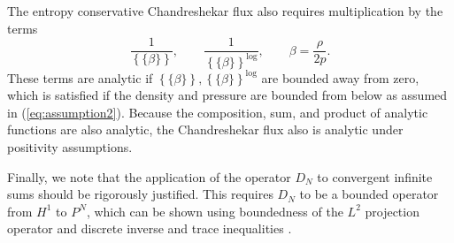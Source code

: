 \documentclass[preprint,10pt]{article}
\theoremstyle{definition}
\theoremstyle{lemma}
\theoremstyle{theorem}
\theoremstyle{assumption}
\newcommand{\LRc}[1]{\left\{ #1 \right\}}
\newcommand{\avg}[1] {\ensuremath{\LRc{\!\{#1\}\!}}}
\begin{document}
The entropy conservative Chandreshekar flux also requires multiplication by the terms
\[
\frac{1}{\avg{\beta}}, \qquad \frac{1}{\avg{\beta}^{\log}}, \qquad \beta = \frac{\rho}{2p}.
\]
These terms are analytic if $\avg{\beta}, \avg{\beta}^{\log}$ are bounded away from zero, which is satisfied if the density and pressure are bounded from below as assumed in (\ref{eq:assumption2}).  Because the composition, sum, and product of analytic functions are also analytic, the Chandreshekar flux also is analytic under positivity assumptions.  

Finally, we note that the application of the operator $D_N$ to convergent infinite sums should be rigorously justified.  
This requires $D_N$ to be a bounded operator from $H^1$ to $P^N$, which can be shown using boundedness of the $L^2$ projection operator and discrete inverse and trace inequalities \cite{chan2015gpu}.  



\end{document}
